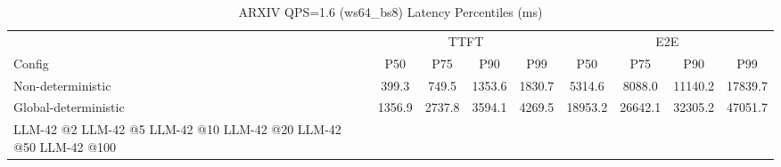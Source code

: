 \begin{table}[htbp]
\centering
\caption{ARXIV QPS=1.6 (ws64_bs8) Latency Percentiles (ms)}
\label{tab:arxiv_qps1.6_ws64_bs8}
\begin{tabular}{l|cccc|cccc}
\toprule
& \multicolumn{4}{c|}{TTFT} & \multicolumn{4}{c}{E2E} \\
Config & P50 & P75 & P90 & P99 & P50 & P75 & P90 & P99 \\
\midrule
Non-deterministic & 399.3 & 749.5 & 1353.6 & 1830.7 & 5314.6 & 8088.0 & 11140.2 & 17839.7 \\
Global-deterministic & 1356.9 & 2737.8 & 3594.1 & 4269.5 & 18953.2 & 26642.1 & 32305.2 & 47051.7 \\
LLM-42 @2%
LLM-42 @5%
LLM-42 @10%
LLM-42 @20%
LLM-42 @50%
LLM-42 @100%
\bottomrule
\end{tabular}
\end{table}
